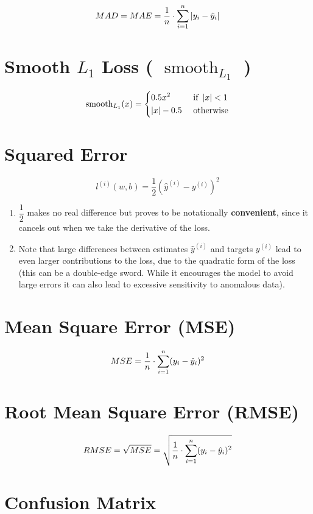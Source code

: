 \[
    MAD = MAE = \displaystyle\dfrac{1}{n} \cdot \displaystyle\sum_{i=1}^{n} \left|  y_i - \hat{y}_i  \right|
\]

\section{Smooth $L_1$ Loss ( $\operatorname{smooth}_{L_1}$ )}
\[
    \displaystyle
    \operatorname{smooth}_{L_1}(x) = \begin{dcases}
        0.5x^2 & \text{ if } \left| x \right| < 1 \\
        \left| x \right| - 0.5 & \text{ otherwise}
    \end{dcases}
\]


\section{Squared Error \cite{dnn-1}} \label{Squared Error}

\[
    l^{(i)}(w,b) = \dfrac{1}{2}
    \left( \hat{y}^{(i)} - y^{(i)} \right)^2
\]

\begin{enumerate}
    \item $\dfrac{1}{2}$ makes no real difference but proves to be notationally \textbf{convenient}, since it cancels out when we take the derivative of the loss.

    \item Note that large differences between estimates $\hat{y}^{(i)}$ and targets $y^{(i)}$ lead to even larger contributions to the loss, due to the quadratic form of the loss (this can be a double-edge sword. While it encourages the model to avoid large errors it can also lead to excessive sensitivity to anomalous data).
\end{enumerate}

\section{Mean Square Error (MSE)}\label{Mean Square Error (MSE)}
\[
    MSE = \displaystyle\dfrac{1}{n} \cdot \displaystyle\sum_{i=1}^{n} ( y_i - \hat{y}_i )^2
\]

\section{Root Mean Square Error (RMSE)}\label{Root Mean Square Error (RMSE)}
\[
    RMSE = \sqrt{MSE} = \displaystyle\sqrt{\dfrac{1}{n} \cdot \displaystyle\sum_{i=1}^{n} ( y_i - \hat{y}_i )^2}
\]


\section{Confusion Matrix}
